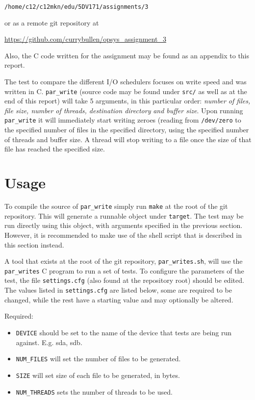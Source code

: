 \documentclass[10pt, titlepage, oneside, a4paper]{article}
\begin{document}
        \texttt{/home/c12/c12mkn/edu/5DV171/assignments/3} 
        
        or as a remote git repository at
        
        \url{https://github.com/currybullen/opsys_assignment_3}
        
        Also, the C code written for the assignment may be found as an appendix to this report.
    
        The test to compare the different I/O schedulers focuses on write speed and was written in C. \texttt{par\_write} (source code may be found under \texttt{src/} as well as at the end of this report) will take 5 arguments, in this particular order: \emph{number of files, file size, number of threads, destination directory} \emph{and buffer size}. Upon running \texttt{par\_write} it will immediately start writing zeroes (reading from \texttt{/dev/zero} to the specified number of files in the specified directory, using the specified number of threads and buffer size. A thread will stop writing to a file once the size of that file has reached the specified size.
        
    \section{Usage}
 
        To compile the source of \texttt{par\_write} simply run \texttt{make} at the root of the git repository. This will generate a runnable object under \texttt{target}. The test may be run directly using this object, with arguments specified in the previous section. However, it is recommended to make use of the shell script that is described in this section instead.
        
        A tool that exists at the root of the git repository, \texttt{par\_writes.sh}, will use the \texttt{par\_writes} C program to run a set of tests. To configure the parameters of the test, the file \texttt{settings.cfg} (also found at the repository root) should be edited. The values listed in \texttt{settings.cfg} are listed below, some are required to be changed, while the rest have a starting value and may optionally be altered.
        
        Required:
        
        \begin{itemize}
            \item \texttt{DEVICE} should be set to the name of the device that tests are being run against. E.g. sda, sdb.
            \item \texttt{NUM\_FILES} will set the number of files to be generated.
            \item \texttt{SIZE} will set size of each file to be generated, in bytes.
            \item \texttt{NUM\_THREADS} sets the number of threads to be used.
        \end{itemize}
        
\end{document}
